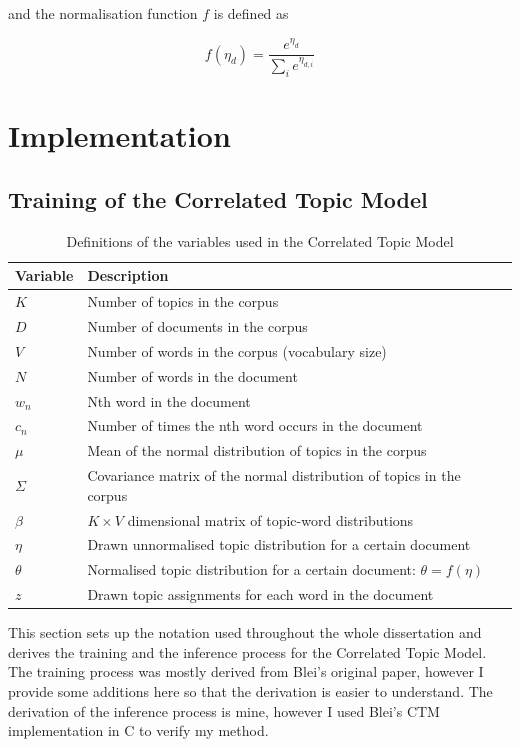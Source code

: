 \documentclass[12pt,a4paper,twoside,openright]{report}
\begin{document}
and the normalisation function $f$ is defined as 

\begin{equation}
f(\eta_d) = \frac{e^{\eta_d}}{\sum\limits_i e^{\eta_{d, i}}}
\end{equation}

\chapter{Implementation}

\section{Training of the Correlated Topic Model}

\begin{table}
\begin{tabular}{| l | l |}
\hline
Variable & Description \\
\hline
$K$ & Number of topics in the corpus \\
$D$ & Number of documents in the corpus \\
$V$ & Number of words in the corpus (vocabulary size) \\
$N$ & Number of words in the document \\
$w_n$ & Nth word in the document \\
$c_n$ & Number of times the nth word occurs in the document \\
$\mu$ & Mean of the normal distribution of topics in the corpus \\
$\Sigma$ & Covariance matrix of the normal distribution of topics in the corpus \\
$\beta$ & $K \times V$ dimensional matrix of topic-word distributions \\
$\eta$ & Drawn unnormalised topic distribution for a certain document \\
$\theta$ & Normalised topic distribution for a certain document: $\theta = f(\eta)$ \\
$z$ & Drawn topic assignments for each word in the document \\
\hline
\end{tabular}
\caption{Definitions of the variables used in the Correlated Topic Model}
\label{tab:ctm-variables}
\end{table}

This section sets up the notation used throughout the whole dissertation and derives the training and the inference process for the Correlated Topic Model. The training process was mostly derived from Blei's original paper, however I provide some additions here so that the derivation is easier to understand. The derivation of the inference process is mine, however I used Blei's CTM implementation in C to verify my method.
\end{document}
